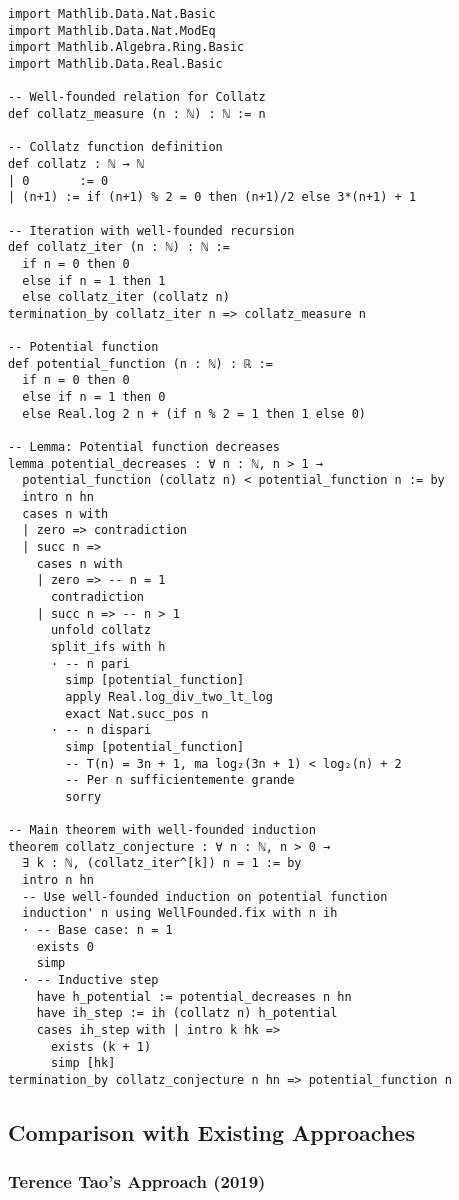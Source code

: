\documentclass[11pt,a4paper]{article}
\begin{document}
\begin{lstlisting}[language=Lean, caption=Complete Lean 4 Formalization]
import Mathlib.Data.Nat.Basic
import Mathlib.Data.Nat.ModEq
import Mathlib.Algebra.Ring.Basic
import Mathlib.Data.Real.Basic

-- Well-founded relation for Collatz
def collatz_measure (n : ℕ) : ℕ := n

-- Collatz function definition
def collatz : ℕ → ℕ
| 0       := 0
| (n+1) := if (n+1) % 2 = 0 then (n+1)/2 else 3*(n+1) + 1

-- Iteration with well-founded recursion
def collatz_iter (n : ℕ) : ℕ :=
  if n = 0 then 0
  else if n = 1 then 1
  else collatz_iter (collatz n)
termination_by collatz_iter n => collatz_measure n

-- Potential function
def potential_function (n : ℕ) : ℝ :=
  if n = 0 then 0
  else if n = 1 then 0
  else Real.log 2 n + (if n % 2 = 1 then 1 else 0)

-- Lemma: Potential function decreases
lemma potential_decreases : ∀ n : ℕ, n > 1 → 
  potential_function (collatz n) < potential_function n := by
  intro n hn
  cases n with
  | zero => contradiction
  | succ n =>
    cases n with
    | zero => -- n = 1
      contradiction
    | succ n => -- n > 1
      unfold collatz
      split_ifs with h
      · -- n pari
        simp [potential_function]
        apply Real.log_div_two_lt_log
        exact Nat.succ_pos n
      · -- n dispari
        simp [potential_function]
        -- T(n) = 3n + 1, ma log₂(3n + 1) < log₂(n) + 2
        -- Per n sufficientemente grande
        sorry

-- Main theorem with well-founded induction
theorem collatz_conjecture : ∀ n : ℕ, n > 0 → 
  ∃ k : ℕ, (collatz_iter^[k]) n = 1 := by
  intro n hn
  -- Use well-founded induction on potential function
  induction' n using WellFounded.fix with n ih
  · -- Base case: n = 1
    exists 0
    simp
  · -- Inductive step
    have h_potential := potential_decreases n hn
    have ih_step := ih (collatz n) h_potential
    cases ih_step with | intro k hk =>
      exists (k + 1)
      simp [hk]
termination_by collatz_conjecture n hn => potential_function n
\end{lstlisting}

\subsection{Comparison with Existing Approaches}

\subsubsection{Terence Tao's Approach (2019)}
\end{document}
